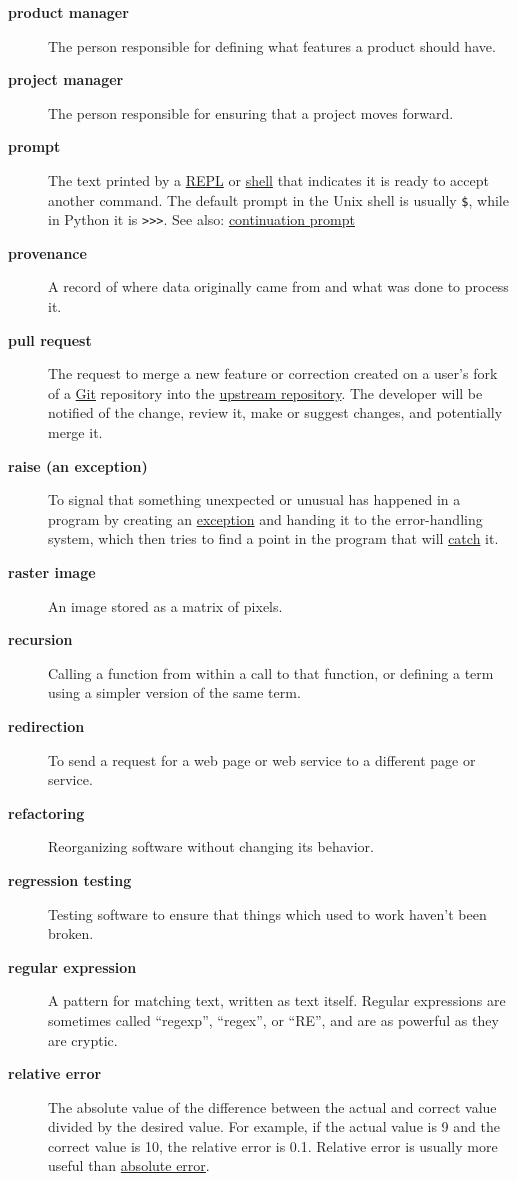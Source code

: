 \documentclass[
]{krantz}
\begin{document}
\begin{description}
\item[\textbf{product manager}]
The person responsible for defining what features a product should have.
\item[\textbf{project manager}]
The person responsible for ensuring that a project moves forward.
\item[\textbf{prompt}]
The text printed by a \protect\hyperlink{repl}{REPL} or \protect\hyperlink{shell}{shell} that indicates it is ready to accept another command. The default prompt in the Unix shell is usually \texttt{\$}, while in Python it is \texttt{\textgreater{}\textgreater{}\textgreater{}}. See also: \protect\hyperlink{continuation_prompt}{continuation prompt}
\item[\textbf{provenance}]
A record of where data originally came from and what was done to process it.
\item[\textbf{pull request}]
The request to merge a new feature or correction created on a user's fork of a \protect\hyperlink{git}{Git} repository into the \protect\hyperlink{upstream_repository}{upstream repository}. The developer will be notified of the change, review it, make or suggest changes, and potentially merge it.
\item[\textbf{raise (an exception)}]
To signal that something unexpected or unusual has happened in a program by creating an \protect\hyperlink{exception}{exception} and handing it to the error-handling system, which then tries to find a point in the program that will \protect\hyperlink{catch_exception}{catch} it.
\item[\textbf{raster image}]
An image stored as a matrix of pixels.
\item[\textbf{recursion}]
Calling a function from within a call to that function, or defining a term using a simpler version of the same term.
\item[\textbf{redirection}]
To send a request for a web page or web service to a different page or service.
\item[\textbf{refactoring}]
Reorganizing software without changing its behavior.
\item[\textbf{regression testing}]
Testing software to ensure that things which used to work haven't been broken.
\item[\textbf{regular expression}]
A pattern for matching text, written as text itself. Regular expressions are sometimes called ``regexp'', ``regex'', or ``RE'', and are as powerful as they are cryptic.
\item[\textbf{relative error}]
The absolute value of the difference between the actual and correct value divided by the desired value. For example, if the actual value is 9 and the correct value is 10, the relative error is 0.1. Relative error is usually more useful than \protect\hyperlink{absolute_error}{absolute error}.

\end{description}
\end{document}
